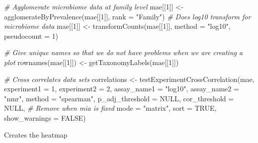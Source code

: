 \documentclass[
]{book}
\newenvironment{Shaded}{\begin{snugshade}}{\end{snugshade}}
\newcommand{\AttributeTok}[1]{\textcolor[rgb]{0.77,0.63,0.00}{#1}}
\newcommand{\CommentTok}[1]{\textcolor[rgb]{0.56,0.35,0.01}{\textit{#1}}}
\newcommand{\ConstantTok}[1]{\textcolor[rgb]{0.00,0.00,0.00}{#1}}
\newcommand{\DecValTok}[1]{\textcolor[rgb]{0.00,0.00,0.81}{#1}}
\newcommand{\FunctionTok}[1]{\textcolor[rgb]{0.00,0.00,0.00}{#1}}
\newcommand{\NormalTok}[1]{#1}
\newcommand{\OtherTok}[1]{\textcolor[rgb]{0.56,0.35,0.01}{#1}}
\newcommand{\StringTok}[1]{\textcolor[rgb]{0.31,0.60,0.02}{#1}}
\begin{document}
\begin{Shaded}
\begin{Highlighting}[]
\CommentTok{\# Agglomerate microbiome data at family level}
\NormalTok{mae[[}\DecValTok{1}\NormalTok{]] }\OtherTok{\textless{}{-}} \FunctionTok{agglomerateByPrevalence}\NormalTok{(mae[[}\DecValTok{1}\NormalTok{]], }\AttributeTok{rank =} \StringTok{"Family"}\NormalTok{)}
\CommentTok{\# Does log10 transform for microbiome data}
\NormalTok{mae[[}\DecValTok{1}\NormalTok{]] }\OtherTok{\textless{}{-}} \FunctionTok{transformCounts}\NormalTok{(mae[[}\DecValTok{1}\NormalTok{]], }\AttributeTok{method =} \StringTok{"log10"}\NormalTok{, }\AttributeTok{pseudocount =} \DecValTok{1}\NormalTok{)}

\CommentTok{\# Give unique names so that we do not have problems when we are creating a plot}
\FunctionTok{rownames}\NormalTok{(mae[[}\DecValTok{1}\NormalTok{]]) }\OtherTok{\textless{}{-}} \FunctionTok{getTaxonomyLabels}\NormalTok{(mae[[}\DecValTok{1}\NormalTok{]])}

\CommentTok{\# Cross correlates data sets}
\NormalTok{correlations }\OtherTok{\textless{}{-}} \FunctionTok{testExperimentCrossCorrelation}\NormalTok{(mae, }
                                               \AttributeTok{experiment1 =} \DecValTok{1}\NormalTok{,}
                                               \AttributeTok{experiment2 =} \DecValTok{2}\NormalTok{,}
                                               \AttributeTok{assay\_name1 =} \StringTok{"log10"}\NormalTok{, }
                                               \AttributeTok{assay\_name2 =} \StringTok{"nmr"}\NormalTok{,}
                                               \AttributeTok{method =} \StringTok{"spearman"}\NormalTok{, }
                                               \AttributeTok{p\_adj\_threshold =} \ConstantTok{NULL}\NormalTok{,}
                                               \AttributeTok{cor\_threshold =} \ConstantTok{NULL}\NormalTok{,}
                                               \CommentTok{\# Remove when mia is fixed}
                                               \AttributeTok{mode =} \StringTok{"matrix"}\NormalTok{,}
                                               \AttributeTok{sort =} \ConstantTok{TRUE}\NormalTok{,}
                                               \AttributeTok{show\_warnings =} \ConstantTok{FALSE}\NormalTok{)}
\end{Highlighting}
\end{Shaded}

Creates the heatmap
\end{document}
